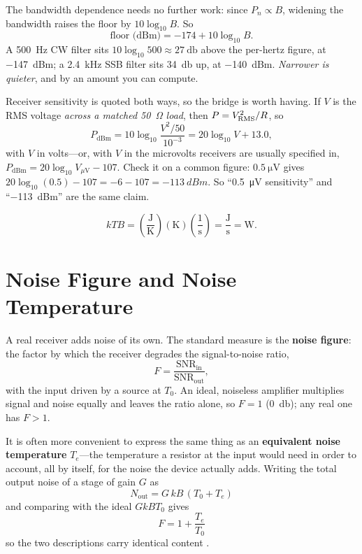 The bandwidth dependence needs no further work: since \(P_n\propto B\), widening the
bandwidth raises the floor by \(10\log_{10}B\). So
\[
\text{floor (dBm)}=-174+10\log_{10}B .
\]
A \SI{500}{\hertz} CW filter sits \(10\log_{10}500\approx\SI{27}{\decibel}\) above the
per-hertz figure, at \SI{-147}{dBm}; a \SI{2.4}{\kilo\hertz} SSB filter sits
\SI{34}{\decibel} up, at \SI{-140}{dBm}. \emph{Narrower is quieter}, and by an amount
you can compute.

\begin{workedbox}
Receiver sensitivity is quoted both ways, so the bridge is worth having. If \(V\)
is the RMS voltage \emph{across a matched \SI{50}{\ohm} load}, then
\(P=V_{\mathrm{RMS}}^2/R\), so
\[
P_{\mathrm{dBm}}=10\log_{10}\frac{V^2/50}{10^{-3}}
=20\log_{10}V+13.0 ,
\]
with \(V\) in volts---or, with \(V\) in the microvolts receivers are usually specified
in, \(P_{\mathrm{dBm}}=20\log_{10}V_{\mu\mathrm{V}}-107\). Check it on a common
figure: \(\SI{0.5}{\micro\volt}\) gives
\(20\log_{10}(0.5)-107=-6-107=\SI{-113}{dBm}\). So ``\SI{0.5}{\micro\volt}
sensitivity'' and ``\SI{-113}{dBm}'' are the same claim.
\end{workedbox}

\begin{unitsbox}
\[
kTB=\left(\frac{\si{\joule}}{\si{\kelvin}}\right)(\si{\kelvin})
\left(\frac{1}{\si{\second}}\right)=\frac{\si{\joule}}{\si{\second}}=\si{\watt}.
\]
\end{unitsbox}

\section{Noise Figure and Noise Temperature}
\label{sec:noisefigure}
A real receiver adds noise of its own. The standard measure is the \textbf{noise
figure}: the factor by which the receiver degrades the signal-to-noise ratio,
\[
F=\frac{\mathrm{SNR}_{\mathrm{in}}}{\mathrm{SNR}_{\mathrm{out}}},
\]
with the input driven by a source at \(T_0\). An ideal, noiseless amplifier multiplies
signal and noise equally and leaves the ratio alone, so \(F=1\) (\SI{0}{\decibel}); any
real one has \(F>1\).

It is often more convenient to express the same thing as an \textbf{equivalent noise
temperature} \(T_e\)---the temperature a resistor at the input would need in order to
account, all by itself, for the noise the device actually adds. Writing the total output
noise of a stage of gain \(G\) as
\[
N_{\mathrm{out}}=G\,kB\,(T_0+T_e)
\]
and comparing with the ideal \(GkBT_0\) gives
\[
\boxed{\;F=1+\frac{T_e}{T_0}\;}
\]
so the two descriptions carry identical content
\cite[pp.~262--263]{weber2001microwave}.

